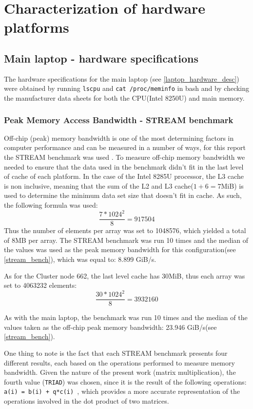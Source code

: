 \documentclass{article}
\begin{document}
\section{Characterization of hardware platforms}
\subsection{Main laptop - hardware specifications}
The hardware specifications for the main laptop (see \ref{laptop_hardware_desc}) were obtained by 
running \verb|lscpu| and \verb|cat /proc/meminfo| in bash and by checking the manufacturer
data sheets for both the CPU(Intel 8250U) and main memory.

\subsubsection{Peak Memory Access Bandwidth - STREAM benchmark}
Off-chip (peak) memory bandwidth is one of the most determining factors in computer performance and can be measured in a number of ways, for this report the STREAM 
benchmark was used \cite{stream_bench}. To measure off-chip memory bandwidth we needed to ensure that the data used in the benchmark didn't fit in the last level of 
cache of each platform. In the case of the Intel 8285U processor, the L3 cache is non inclusive, meaning that the sum of the L2 and L3 cache($1+6=7$MiB) is used to determine the 
minimum data set size that doesn't fit in cache. As such, the following formula was used: 
\newline
$$\frac{7*1024^2}{8} = 917504 $$
\newline 
Thus the number of elements per array was set to 1048576, which yielded a total of 8MB per array. The STREAM benchmark was run 10 times and the median of the values 
was used as the peak memory bandwidth for this configuration(see \ref{stream_bench}), which was equal to:  8.899 GiB/s.

As for the Cluster node 662, the last level cache has 30MiB, thus each array was set to 4063232 elements:
$$\frac{30*1024^2}{8} = 3932160 $$

As with the main laptop, the benchmark was run 10 times and the median of the values taken as the off-chip peak memory bandwidth: 23.946 GiB/s(see \ref{stream_bench}).

One thing to note is the fact that each STREAM benchmark presents four different results, each based on the operations performed to measure memory bandwidth. Given the nature of the present work (matrix multiplication), the fourth value (\texttt{TRIAD}) was chosen, since it is the result of the following operations: \texttt{ a(i) = b(i) + q*c(i) }, which provides a more accurate representation of the operations involved in the dot product of two matrices.
\end{document}
